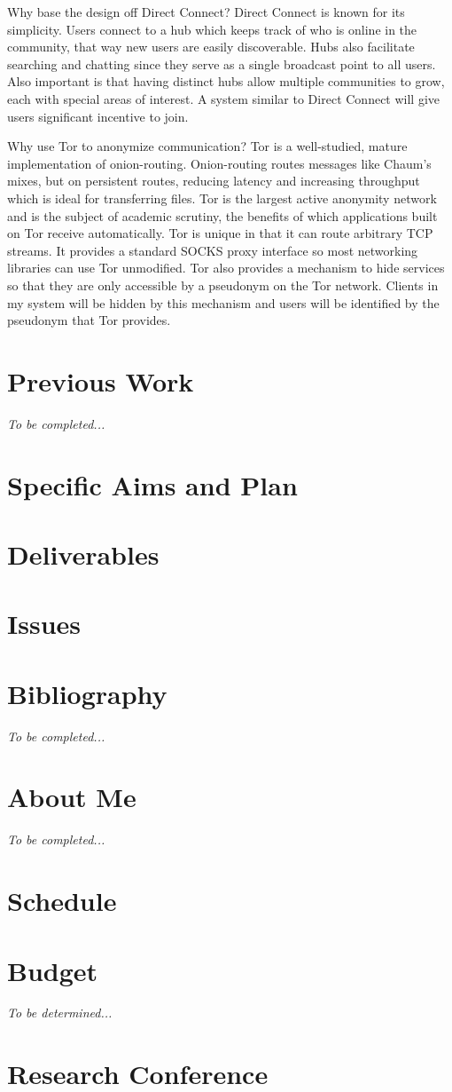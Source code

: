 \documentclass[12pt]{article}
\begin{document}
Why base the design off Direct Connect?  Direct Connect is known for its simplicity.  Users connect to a hub which keeps track of who is online in the community, that way new users are easily discoverable.  Hubs also facilitate searching and chatting since they serve as a single broadcast point to all users.  Also important is that having distinct hubs allow multiple communities to grow, each with special areas of interest.  A system similar to Direct Connect will give users significant incentive to join.

Why use Tor to anonymize communication?  Tor is a well-studied, mature implementation of onion-routing.  Onion-routing routes messages like Chaum's mixes, but on persistent routes, reducing latency and increasing throughput which is ideal for transferring files.  Tor is the largest active anonymity network and is the subject of academic scrutiny, the benefits of which applications built on Tor receive automatically.  Tor is unique in that it can route arbitrary TCP streams.  It provides a standard SOCKS proxy interface so most networking libraries can use Tor unmodified.  Tor also provides a mechanism to hide services so that they are only accessible by a pseudonym on the Tor network.  Clients in my system will be hidden by this mechanism and users will be identified by the pseudonym that Tor provides.

\section{Previous Work}
\emph{To be completed...}

\section{Specific Aims and Plan}

\section{Deliverables}


\section{Issues}

\section{Bibliography}
\emph{To be completed...}

\section{About Me}
\emph{To be completed...}

\section{Schedule}

\section{Budget}
\emph{To be determined...}

\appendix
\section{Research Conference}
\end{document}
